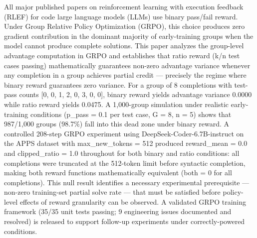 
All major published papers on reinforcement learning with execution feedback (RLEF) for code large language models (LLMs) use binary pass/fail reward. Under Group Relative Policy Optimization (GRPO), this choice produces zero gradient contribution in the dominant majority of early-training groups when the model cannot produce complete solutions. This paper analyzes the group-level advantage computation in GRPO and establishes that ratio reward (k/n test cases passing) mathematically guarantees non-zero advantage variance whenever any completion in a group achieves partial credit --- precisely the regime where binary reward guarantees zero variance. For a group of 8 completions with test-pass counts [0, 0, 1, 2, 0, 3, 0, 0], binary reward yields advantage variance 0.0000 while ratio reward yields 0.0475. A 1,000-group simulation under realistic early-training conditions (p\_pass = 0.1 per test case, G = 8, n = 5) shows that 987/1,000 groups (98.7\%) fall into this dead zone under binary reward. A controlled 208-step GRPO experiment using DeepSeek-Coder-6.7B-instruct on the APPS dataset with max\_new\_tokens = 512 produced reward\_mean = 0.0 and clipped\_ratio = 1.0 throughout for both binary and ratio conditions: all completions were truncated at the 512-token limit before syntactic completion, making both reward functions mathematically equivalent (both = 0 for all completions). This null result identifies a necessary experimental prerequisite --- non-zero training-set partial solve rate --- that must be satisfied before policy-level effects of reward granularity can be observed. A validated GRPO training framework (35/35 unit tests passing; 9 engineering issues documented and resolved) is released to support follow-up experiments under correctly-powered conditions.

